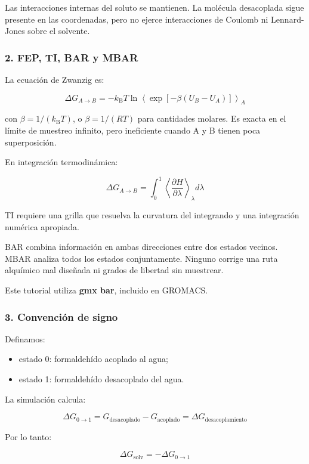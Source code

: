 \documentclass[
  spanish,
  11pt,
  a4paper]{article}
\providecommand{\tightlist}{%
  \setlength{\itemsep}{0pt}\setlength{\parskip}{0pt}}
\begin{document}
Las interacciones internas del soluto se mantienen. La molécula
desacoplada sigue presente en las coordenadas, pero no ejerce
interacciones de Coulomb ni Lennard-Jones sobre el solvente.

\subsubsection{2. FEP, TI, BAR y MBAR}\label{fep-ti-bar-y-mbar}

La ecuación de Zwanzig es:

\[
\Delta G_{A\rightarrow B}
=
-k_\mathrm{B}T
\ln
\left\langle
\exp[-\beta(U_B-U_A)]
\right\rangle_A
\]

con \(\beta=1/(k_\mathrm{B}T)\), o \(\beta=1/(RT)\) para cantidades
molares. Es exacta en el límite de muestreo infinito, pero ineficiente
cuando A y B tienen poca superposición.

En integración termodinámica:

\[
\Delta G_{A\rightarrow B}
=
\int_0^1
\left\langle
\frac{\partial H}{\partial\lambda}
\right\rangle_\lambda
d\lambda
\]

TI requiere una grilla que resuelva la curvatura del integrando y una
integración numérica apropiada.

BAR combina información en ambas direcciones entre dos estados vecinos.
MBAR analiza todos los estados conjuntamente. Ninguno corrige una ruta
alquímico mal diseñada ni grados de libertad sin muestrear.

Este tutorial utiliza \textbf{gmx bar}, incluido en GROMACS.

\subsubsection{3. Convención de signo}\label{convenciuxf3n-de-signo}

Definamos:

\begin{itemize}
\tightlist
\item
  estado 0: formaldehído acoplado al agua;
\item
  estado 1: formaldehído desacoplado del agua.
\end{itemize}

La simulación calcula:

\[
\Delta G_{0\rightarrow1}
=
G_{\mathrm{desacoplado}}-
G_{\mathrm{acoplado}}
=
\Delta G_{\mathrm{desacoplamiento}}
\]

Por lo tanto:

\[
\boxed{
\Delta G_{\mathrm{solv}}
=
-\Delta G_{0\rightarrow1}
}
\]
\end{document}
